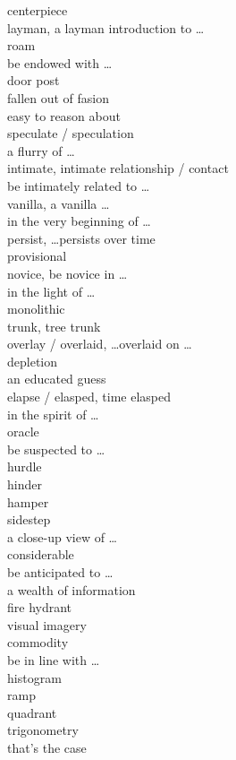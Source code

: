 \documentclass[12pt]{article}
\begin{document}
centerpiece \\
layman, a layman introduction to \dots \\
roam \\
be endowed with \dots \\
door post \\
fallen out of fasion \\
easy to reason about \\
speculate / speculation \\
a flurry of \dots \\
intimate, intimate relationship / contact \\
be intimately related to \dots \\
vanilla, a vanilla \dots \\
in the very beginning of \dots \\
persist, \dots persists over time \\
provisional \\
novice, be novice in \dots \\
in the light of \dots \\
monolithic \\
trunk, tree trunk \\
overlay / overlaid, \dots overlaid on \dots \\
depletion \\
an educated guess \\
elapse / elasped, time elasped \\
in the spirit of \dots \\
oracle \\
be suspected to \dots \\
hurdle \\
hinder \\
hamper \\
sidestep \\
a close-up view of \dots \\
considerable \\
be anticipated to \dots \\
a wealth of information \\
fire hydrant \\
visual imagery \\
commodity \\
be in line with \dots \\
histogram \\
ramp \\
quadrant \\
trigonometry \\
that's the case \\
\end{document}
